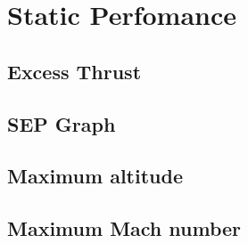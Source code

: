 \section{Static Perfomance}

\subsection{Excess Thrust}

\subsection{SEP Graph}

\subsection{Maximum altitude}

\subsection{Maximum Mach number}
